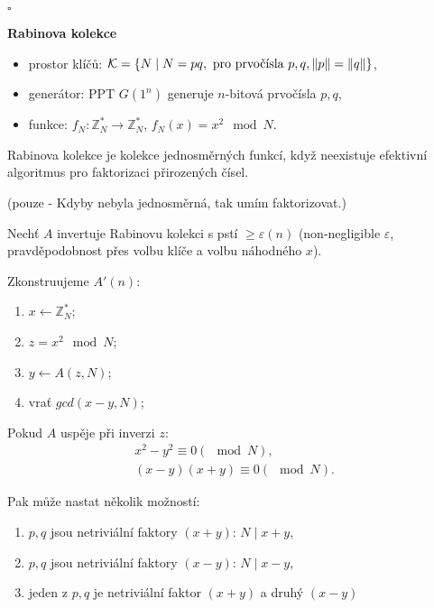 \documentclass[a4paper,12pt,titlepage]{article}
\def\podnadpis#1{{\bigskip\bf\noindent#1\medskip\par}}
\def\tvrzeni{\noindent {\bf Tvrzení: }}
\def\dukaz{\noindent {\bf Důkaz: }}
\def\qed{{\hfill{$\square$}}}
\begin{document}
\qed

\podnadpis{Rabinova kolekce}
\begin{itemize}
  \item prostor klíčů: $\mathcal{K} = \left\lbrace N \mid N = pq, \hbox{ pro prvočísla } p, q, \left\Vert p \right\Vert = \left\Vert q \right\Vert\right\rbrace$,
  
  \item generátor: PPT $G\left(1^n\right)$ generuje $n$-bitová prvočísla $p, q$,
  
  \item funkce: $f_N: \mathbb{Z}_N^\ast \rightarrow \mathbb{Z}_N^\ast$, $f_N\left(x\right) = x^2 \mod N$.
\end{itemize}

\tvrzeni Rabinova kolekce je kolekce jednosměrných funkcí, když neexistuje efektivní algoritmus pro faktorizaci přirozených čísel. 

\dukaz (pouze \uv{$\Leftarrow$} - Kdyby nebyla jednosměrná, tak umím faktorizovat.)

Nechť $A$ invertuje Rabinovu kolekci s pstí $\ge \varepsilon\left(n\right)$ (non-negligible $\varepsilon$, pravděpodobnost přes volbu klíče a volbu náhodného $x$).

Zkonstruujeme $A'\left(n\right)$:
\begin{enumerate}
  \item $x \leftarrow \mathbb{Z}_N^\ast$;
  \item $z = x^2 \mod N$;
  \item $y \leftarrow A\left(z, N\right)$;
  \item vrať $gcd\left(x-y, N\right)$;
\end{enumerate} 

Pokud $A$ uspěje při inverzi $z$: 
\begin{align*}
  x^2 - y^2 \equiv 0 \left(\mod N\right), \\
  \left(x-y\right)\left(x+y\right) \equiv 0 \left(\mod N\right).
\end{align*}

Pak může nastat několik možností:
\begin{enumerate}
  \item $p,q$ jsou netriviální faktory $\left(x+y\right)$: $N \mid x+y$,
  \item $p,q$ jsou netriviální faktory $\left(x-y\right)$: $N \mid x-y$,
  \item jeden z $p,q$ je netriviální faktor $\left(x+y\right)$ a druhý $\left(x-y\right)$
\end{enumerate}
\end{document}
